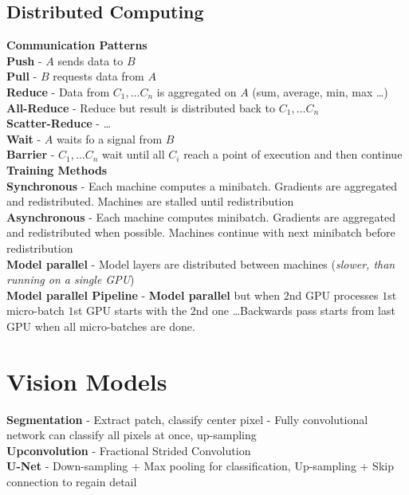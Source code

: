 \begin{multicols}{2}
    \begin{mdframed}[style=eqbox]
        \subsection{Distributed Computing}
        \textbf{Communication Patterns}\\
        \textbf{Push} - $A$ sends data to $B$\\
        \textbf{Pull} - $B$ requests data from $A$\\
        \textbf{Reduce} - Data from $C_1, \dots C_n$ is aggregated on $A$ (sum, average, min, max \dots)\\
        \textbf{All-Reduce} - Reduce but result is distributed back to $C_1, \dots C_n$\\
        \textbf{Scatter-Reduce} - \dots\\
        \textbf{Wait} - $A$ waits fo a signal from $B$\\
        \textbf{Barrier} - $C_1, \dots C_n$ wait until all $C_i$ reach a point of execution and then continue\\[0.5em]
        \textbf{Training Methods}\\
        \textbf{Synchronous} - Each machine computes a minibatch. Gradients are aggregated and redistributed. Machines are stalled until redistribution\\
        \textbf{Asynchronous} - Each machine computes minibatch. Gradients are aggregated and redistributed when possible. Machines continue with next minibatch before redistribution\\
        \textbf{Model parallel} - Model layers are distributed between machines (\textit{slower, than running on a single GPU})\\
        \textbf{Model parallel Pipeline} - \textbf{Model parallel} but when $2$nd GPU processes $1$st micro-batch $1$st GPU starts with the $2$nd one \dots Backwards pass starts from last GPU when all micro-batches are done.
    \end{mdframed}

    \section{Vision Models}
    \begin{mdframed}[style=eqbox]
        \textbf{Segmentation} - Extract patch, classify center pixel - Fully convolutional network can classify all pixels at once, up-sampling\\
        \textbf{Upconvolution} - Fractional Strided Convolution\\
        \textbf{U-Net} - Down-sampling + Max pooling for classification, Up-sampling + Skip connection to regain detail

\end{mdframed}
\end{multicols}
